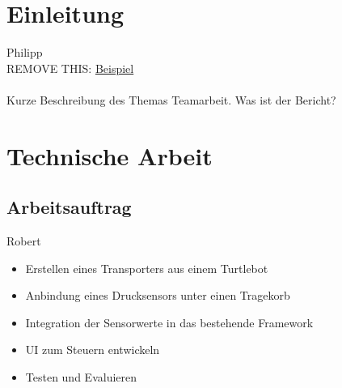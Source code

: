 \documentclass[a4paper,12pt,headsepline,toc=flat]{scrartcl}
\begin{document}
	\tableofcontents
	\newpage
	
	\section{Einleitung}
		Philipp\\
		REMOVE THIS: \href{https://docs.google.com/document/d/1wGlFley6lwhnpLsj8ms7M6fnOjplazlHNr8Bfbv3vso/edit}{Beispiel}\\\\
		Kurze Beschreibung des Themas Teamarbeit. Was ist der Bericht?
	\newpage
	\section{Technische Arbeit}
	
	\subsection{Arbeitsauftrag}
		Robert
		\begin{itemize}
			\item Erstellen eines Transporters aus einem Turtlebot
			\item Anbindung eines Drucksensors unter einen Tragekorb
			\item Integration der Sensorwerte in das bestehende Framework
			\item UI zum Steuern entwickeln
			\item Testen und Evaluieren
		\end{itemize}
	
\end{document}
